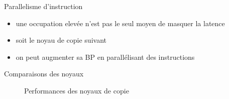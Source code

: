 \documentclass[11pt,mathserif]{beamer}
\newcommand{\argi}{\faLightbulbO}
\newcommand{\kontuz}{\faExclamationTriangle}
\newcommand{\adibi}{\faCommentO}
\newcommand{\harritu}{\faExclamation}
\begin{document}
\begin{frame}{Parallelisme d'instruction}
\pause
\begin{itemize}[<+->]
	\item[\kontuz] une occupation elevée n'est pas le seul moyen de masquer la latence \harritu
    \item[\adibi] soit le noyau de copie suivant
	
    \item[\argi] on peut augmenter sa BP en parallélisant des instructions
	
\end{itemize}
\end{frame}
\begin{frame}{Comparaisons des noyaux}
\begin{figure}[h!]
  \begin{center}
    \caption{Performances des noyaux de copie}
  \end{center}
\end{figure}
\end{frame}
 
\end{document}

